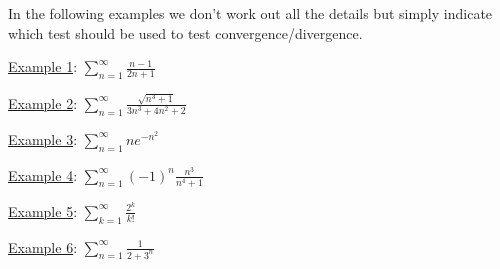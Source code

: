 \documentclass[paper=a4, fontsize=11pt]{scrartcl} %
\numberwithin{equation}{section} %
\numberwithin{figure}{section} %
\numberwithin{table}{section} %
\newcommand{\ds}{\displaystyle}
\begin{document}
In the following examples we don't work out all the details but simply indicate which test should be used to test convergence/divergence.\\
\indent

\underline{Example 1}: $\ds\sum_{n=1}^\infty \ds\frac{n-1}{2n+1}$\\

\vspace{0.9in}

\underline{Example 2}: $\ds\sum_{n=1}^\infty \ds\frac{\ds\sqrt{n^3+1}}{3n^3 + 4n^2 + 2}$\\

\vspace{1.5in}

\underline{Example 3}: $\ds\sum_{n=1}^\infty ne^{-n^2}$\\

\vspace{0.9in}

\underline{Example 4}: $\ds\sum_{n=1}^\infty (-1)^n \ds\frac{n^3}{n^4+1}$\\

\vspace{0.9in}

\underline{Example 5}: $\ds\sum_{k=1}^\infty \ds\frac{2^k}{k!}$\\

\vspace{0.9in}

\underline{Example 6}: $\ds\sum_{n=1}^\infty \ds\frac{1}{2+3^n}$\\

\vspace{1in}

  
  
  
  
  
  
  


  
  
  
  
  


  

\end{document}
